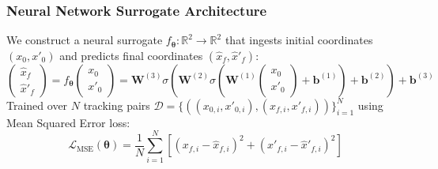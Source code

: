 \documentclass[11pt,a4paper]{article}
\begin{document}
\subsubsection{Neural Network Surrogate Architecture}
We construct a neural surrogate $f_{\boldsymbol{\theta}}: \mathbb{R}^2 \to \mathbb{R}^2$ that ingests initial coordinates $(x_0, x'_0)$ and predicts final coordinates $(\hat{x}_f, \hat{x}'_f)$:
\begin{equation}
    \begin{pmatrix} \hat{x}_f \\ \hat{x}'_f \end{pmatrix} = f_{\boldsymbol{\theta}}\begin{pmatrix} x_0 \\ x'_0 \end{pmatrix} = \mathbf{W}^{(3)} \sigma\left( \mathbf{W}^{(2)} \sigma\left( \mathbf{W}^{(1)} \begin{pmatrix} x_0 \\ x'_0 \end{pmatrix} + \mathbf{b}^{(1)} \right) + \mathbf{b}^{(2)} \right) + \mathbf{b}^{(3)}
\end{equation}
Trained over $N$ tracking pairs $\mathcal{D} = \{((x_{0,i}, x'_{0,i}), (x_{f,i}, x'_{f,i}))\}_{i=1}^N$ using Mean Squared Error loss:
\begin{equation}
    \mathcal{L}_{\text{MSE}}(\boldsymbol{\theta}) = \frac{1}{N} \sum_{i=1}^N \left[ \left( x_{f,i} - \hat{x}_{f,i} \right)^2 + \left( x'_{f,i} - \hat{x}'_{f,i} \right)^2 \right]
\end{equation}
\end{document}
